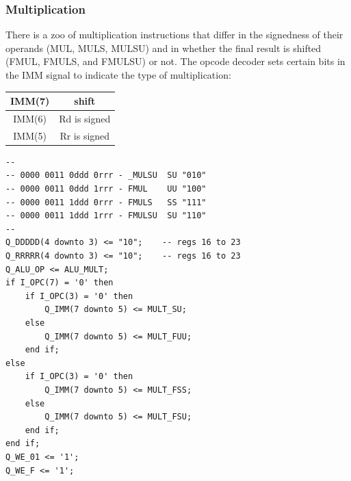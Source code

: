\documentclass[12pt,a4paper]{report}
\begin{document}
\subsubsection{Multiplication}
There is a zoo of multiplication instructions that differ in the signedness of their operands (MUL, MULS, MULSU) and in whether the final result is shifted (FMUL, FMULS, and FMULSU) or not. The opcode decoder sets certain bits in the IMM signal to indicate the type of multiplication:\\
\begin{center}
  \begin{tabular}[h]{|c|c|}
    \hline
    IMM(7) & shift \\
    \hline
    IMM(6) & Rd is signed \\
    \hline
    IMM(5) & Rr is signed \\
    \hline
  \end{tabular}
\end{center}
\begin{lstlisting}
--
-- 0000 0011 0ddd 0rrr - _MULSU  SU "010"
-- 0000 0011 0ddd 1rrr - FMUL    UU "100"
-- 0000 0011 1ddd 0rrr - FMULS   SS "111"
-- 0000 0011 1ddd 1rrr - FMULSU  SU "110"
--
Q_DDDDD(4 downto 3) <= "10";    -- regs 16 to 23
Q_RRRRR(4 downto 3) <= "10";    -- regs 16 to 23
Q_ALU_OP <= ALU_MULT;
if I_OPC(7) = '0' then
    if I_OPC(3) = '0' then
        Q_IMM(7 downto 5) <= MULT_SU;
    else
        Q_IMM(7 downto 5) <= MULT_FUU;
    end if;
else
    if I_OPC(3) = '0' then
        Q_IMM(7 downto 5) <= MULT_FSS;
    else
        Q_IMM(7 downto 5) <= MULT_FSU;
    end if;
end if;
Q_WE_01 <= '1';
Q_WE_F <= '1';
\end{lstlisting}
\end{document}
